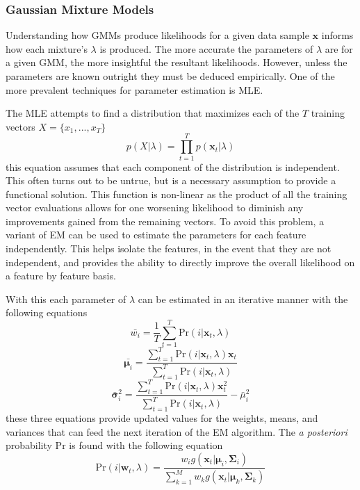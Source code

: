 \subsubsection{Gaussian Mixture Models}
\label{sec:GMM}

Understanding how \acp{GMM} produce likelihoods for a given data sample $\bm{x}$ informs how each mixture's $\lambda$ is produced. The more accurate the parameters of $\lambda$ are for a given \ac{GMM}, the more insightful the resultant likelihoods. However, unless the parameters are known outright they must be deduced empirically. One of the more prevalent techniques for parameter estimation is \ac{MLE}\cite{Hyvarinen2001}.

The \ac{MLE} attempts to find a distribution that maximizes each of the $T$ training vectors $X=\{x_{1},...,x_{T}\}$
\begin{equation}
p(X|\lambda)=\prod_{t=1}^{T}p(\bm{x}_{t}|\lambda)
\end{equation}
this equation assumes that each component of the distribution is independent. This often turns out to be untrue, but is a necessary assumption to provide a functional solution. This function is non-linear as the product of all the training vector evaluations allows for one worsening likelihood to diminish any improvements gained from the remaining vectors. To avoid this problem, a variant of \ac{EM} can be used to estimate the parameters for each feature independently. This helps isolate the features, in the event that they are not independent, and provides the ability to directly improve the overall likelihood on a feature by feature basis.

With this each parameter of $\lambda$ can be estimated in an iterative manner with the following equations
\begin{equation}
\bar{w_{i}} = \frac{1}{T}\sum_{t=1}^{T}\text{Pr}(i|\bm{x}_{t},\lambda)
\end{equation}
\begin{equation}
\bar{\bm{\mu}_{i}} = \frac{\sum_{t=1}^{T}\text{Pr}(i|\bm{x}_{t},\lambda)\bm{x}_{t}}{\sum_{t=1}^{T}\text{Pr}(i|\bm{x}_{t},\lambda)}
\end{equation}
\begin{equation}
\bar{\bm{\sigma}}_{i}^{2} = \frac{\sum_{t=1}^{T}\text{Pr}(i|\bm{x}_{t},\lambda)\bm{x}_{t}^{2}}{\sum_{t=1}^{T}\text{Pr}(i|\bm{x}_{t},\lambda)}-\bar{\mu}_{i}^{2}
\end{equation}
these three equations provide updated values for the weights, means, and variances that can feed the next iteration of the EM algorithm. The \emph{a posteriori} probability Pr is found with the following equation
\begin{equation}
\text{Pr}(i|\bm{w}_t,\lambda)=\frac{w_{i}g(\bm{x}_{t}|\bm{\mu}_{i},\bm{\Sigma}_{i})}{\sum_{k=1}^{M}w_{k}g(\bm{x}_{t}|\bm{\mu}_{k},\bm{\Sigma}_{k})}
\end{equation}


